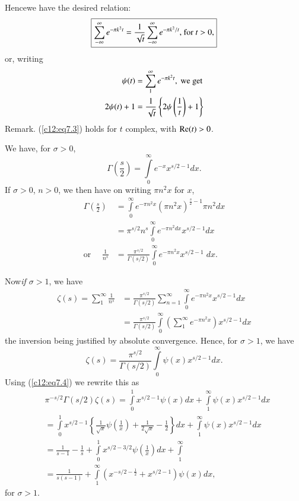 Hence\pageoriginale we have the desired relation:
\begin{equation}
\text{\fbox{$\sum\limits^\infty_{-\infty} e^{-\pi k^2 t} =
    \frac{1}{\sqrt{t}} \sum\limits^\infty_{-\infty} e^{-\pi k^2/t},$
    for $t>0$,}}\label{c12:eq7.3}
\end{equation}
or, writing
\begin{align}
\psi (t) &= \sum\limits^\infty_1 e^{-\pi k^2 t} , \text{ we get}\notag\\
2 \psi (t) + 1 &= \frac{1}{\sqrt{t}} \left\{2\psi \left(
\frac{1}{t}\right)+1 \right\} \label{c12:eq7.4}
\end{align}
Remark. (\ref{c12:eq7.3}) holds for $t$ complex, with $\operatorname{Re} (t)>0$. 


\medskip
{}

We have, for $\sigma >0$,
$$
\Gamma \left( \frac{s}{2}\right) = \int\limits^\infty_0 e^{-x}
x^{s/2-1} dx .
$$
If $\sigma >0$, $n>0$, we then have on writing $\pi n^2 x$ for $x$,
\begin{align*}
\Gamma \left(\frac{s}{2} \right) & = \int\limits^\infty_0 e^{-\pi n^2
  x} (\pi n^2 x)^{\frac{s}{2} -1} \pi n^2 dx\\
& = \pi^{s/2} n^s \int\limits^\infty_0 e^{-\pi n^2 dx } x^{s/2-1} dx\\
\text{or } \quad \frac{1}{n^s} & = \frac{\pi^{s/2}}{\Gamma(s/2)}
\int\limits^\infty_0 e^{-\pi n^2 x} x^{s/2 -1} \; dx.
\end{align*}

Now\pageoriginale \textit{if $\sigma >1$}, we have
\begin{align*}
\zeta(s) = \sum\limits^\infty_1 \frac{1}{n^s} & =
\frac{\pi^{s/2}}{\Gamma(s/2)}  \sum\limits^\infty_{n=1}
\int\limits^\infty_0 e^{-\pi n^2 x} x^{s/2-1} dx\\
& = \frac{\pi^{s/2}}{\Gamma(s/2)} \int\limits^\infty_0
\left(\sum\limits^\infty_1 e^{-\pi n^2 x} \right) x^{s/2 -1} dx
\end{align*}
the inversion being justified by absolute convergence. Hence, for
$\sigma >1$, we have 
$$
\zeta(s) = \frac{\pi^{s/2}}{\Gamma(s/2)} \int\limits^\infty_0 \psi(x)
x^{s/2 -1} dx.
$$
Using (\ref{c12:eq7.4}) we rewrite this as
\begin{align*}
&\pi^{-s/2} \Gamma (s/2) \zeta(s)  = \int\limits^1_0 x^{s/2-1} \psi(x)
  dx + \int\limits^\infty_1 \psi (x) x^{s/2-1} dx\\
&= \int\limits^1_0 x^{s/2 -1} \left\{\frac{1}{\sqrt{x}} \psi
  \left(\frac{1}{x} \right)  + \frac{1}{2\sqrt{x}} -
  \frac{1}{2}\right\}  dx + \int\limits^\infty_1 \psi (x) x^{s/2 -1}
  dx \\
& = \frac{1}{s-1} - \frac{1}{s} + \int\limits^1_0 x^{s/2 - 3/2} \psi
  \left(\frac{1}{x} \right) dx + \int\limits^\infty_1\\
& = \frac{1}{s(s-1)} + \int\limits^\infty_1 \left( x^{-s/2 -
    \frac{1}{2}} + x^{s/2-1}\right) \psi (x) dx , \tag{7.5}\label{c12:eq7.5}
\end{align*}
for $\sigma >1$.

